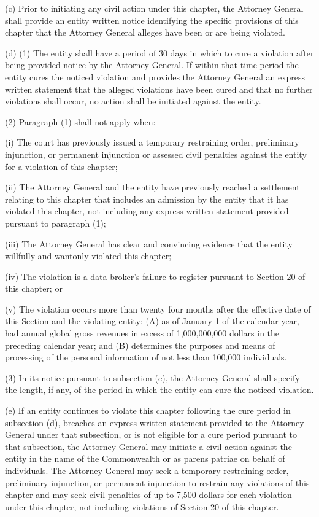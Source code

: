 (c) Prior to initiating any civil action under this chapter, the Attorney General shall provide an entity written notice identifying the specific provisions of this chapter that the Attorney General alleges have been or are being violated.

(d) (1) The entity shall have a period of 30 days in which to cure a violation after being provided notice by the Attorney General. If within that time period the entity cures the noticed violation and provides the Attorney General an express written statement that the alleged violations have been cured and that no further violations shall occur, no action shall be initiated against the entity.

(2) Paragraph (1) shall not apply when:

(i) The court has previously issued a temporary restraining order, preliminary injunction, or permanent injunction or assessed civil penalties against the entity for a violation of this chapter;

(ii) The Attorney General and the entity have previously reached a settlement relating to this chapter that includes an admission by the entity that it has violated this chapter, not including any express written statement provided pursuant to paragraph (1);

(iii) The Attorney General has clear and convincing evidence that the entity willfully and wantonly violated this chapter;

(iv) The violation is a data broker’s failure to register pursuant to Section 20 of this chapter; or

(v) The violation occurs more than twenty four months after the effective date of this Section and the violating entity: (A) as of January 1 of the calendar year, had annual global gross revenues in excess of 1,000,000,000 dollars in the preceding calendar year; and (B) determines the purposes and means of processing of the personal information of not less than 100,000 individuals.

(3) In its notice pursuant to subsection (c), the Attorney General shall specify the length, if any, of the period in which the entity can cure the noticed violation.

(e) If an entity continues to violate this chapter following the cure period in subsection (d), breaches an express written statement provided to the Attorney General under that subsection, or is not eligible for a cure period pursuant to that subsection, the Attorney General may initiate a civil action against the entity in the name of the Commonwealth or as parens patriae on behalf of individuals. The Attorney General may seek a temporary restraining order, preliminary injunction, or permanent injunction to restrain any violations of this chapter and may seek civil penalties of up to 7,500 dollars for each violation under this chapter, not including violations of Section 20 of this chapter.

